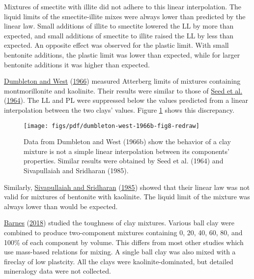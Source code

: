 \documentclass[
  letterpaper,
  openany]{book}
\begin{document}
Mixtures of smectite with illite did not adhere to this linear interpolation.
The liquid limits of the smectite-illite mixes were always lower than predicted by the linear law.
Small additions of illite to smectite lowered the LL by more than expected, and small additions of smectite to illite raised the LL by less than expected.
An opposite effect was observed for the plastic limit. With small bentonite additions, the plastic limit was lower than expected, while for larger bentonite additions it was higher than expected.

\protect\hyperlink{ref-Dumbleton1966b}{Dumbleton and West} (\protect\hyperlink{ref-Dumbleton1966b}{1966}) measured Atterberg limits of mixtures containing montmorillonite and kaolinite.
Their results were similar to those of \protect\hyperlink{ref-Seed1964a}{Seed et al.} (\protect\hyperlink{ref-Seed1964a}{1964}).
The LL and PL were suppressed below the values predicted from a linear interpolation between the two clays' values. Figure \ref{fig:dumbleton-west-1666b-fig8-redraw} shows this discrepancy.

\begin{figure}

{\centering \texttt{[image: figs/pdf/dumbleton-west-1966b-fig8-redraw]} 

}

\caption[Atterberg limits of clay mixtures (from Dumbleton and West, 1966b)]{Data from Dumbleton and West (1966b) show the behavior of a clay mixture is not a simple linear interpolation between its components' properties. Similar results were obtained by Seed et al. (1964) and Sivapullaiah and Sridharan (1985).}\label{fig:dumbleton-west-1666b-fig8-redraw}
\end{figure}

Similarly, \protect\hyperlink{ref-Sivapullaiah1985}{Sivapullaiah and Sridharan} (\protect\hyperlink{ref-Sivapullaiah1985}{1985}) showed that their linear law was not valid for mixtures of bentonite with kaolinite.
The liquid limit of the mixture was always lower than would be expected.

\protect\hyperlink{ref-Barnes2018}{Barnes} (\protect\hyperlink{ref-Barnes2018}{2018}) studied the toughness of clay mixtures.
Various ball clay were combined to produce two-component mixtures containing 0, 20, 40, 60, 80, and 100\% of each component by volume.
This differs from most other studies which use mass-based relations for mixing.
A single ball clay was also mixed with a fireclay of low plastcity.
All the clays were kaolinite-dominated, but detailed mineralogy data were not collected.
\end{document}
